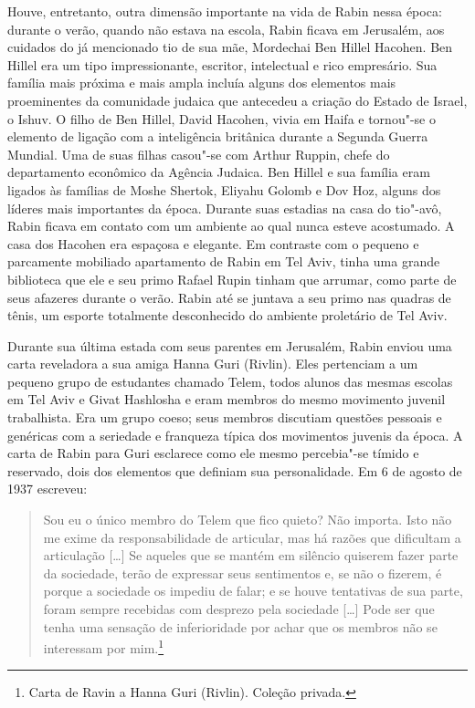 Houve, entretanto, outra dimensão importante na vida de Rabin nessa
época: durante o verão, quando não estava na escola, Rabin ficava em
Jerusalém, aos cuidados do já mencionado tio de sua mãe, Mordechai Ben Hillel Hacohen.
Ben Hillel era um tipo impressionante, escritor, intelectual e rico
empresário. Sua família mais próxima e mais ampla incluía alguns dos
elementos mais proeminentes da comunidade judaica que antecedeu a
criação do Estado de Israel, o Ishuv. O filho de Ben Hillel, David
Hacohen, vivia em Haifa e tornou"-se o elemento de ligação com a
inteligência britânica durante a Segunda Guerra Mundial. Uma de suas
filhas casou"-se com Arthur Ruppin, chefe do departamento econômico da
Agência Judaica. Ben Hillel e sua família eram ligados às famílias de
Moshe Shertok, Eliyahu Golomb e Dov Hoz, alguns dos líderes mais
importantes da época. Durante suas estadias na casa do tio"-avô, Rabin ficava
em contato com um ambiente ao qual nunca esteve acostumado. A casa dos
Hacohen era espaçosa e elegante. Em contraste com o pequeno e parcamente
mobiliado apartamento de Rabin em Tel Aviv, tinha uma grande biblioteca
que ele e seu primo Rafael Rupin tinham que arrumar, como parte de
seus afazeres durante o verão. Rabin até se juntava a seu primo nas
quadras de tênis, um esporte totalmente desconhecido do ambiente
proletário de Tel Aviv.

Durante sua última estada com seus parentes em Jerusalém, Rabin enviou
uma carta reveladora a sua amiga Hanna Guri (Rivlin). Eles pertenciam a
um pequeno grupo de estudantes chamado Telem, todos alunos das mesmas
escolas em Tel Aviv e Givat Hashlosha e eram membros do mesmo movimento
juvenil trabalhista. Era um grupo coeso; seus membros discutiam questões
pessoais e genéricas com a seriedade e franqueza típica dos movimentos
juvenis da época. A carta de Rabin para Guri esclarece como ele mesmo
percebia"-se tímido e reservado, dois dos elementos que definiam sua
personalidade. Em 6 de agosto de 1937 escreveu: 

\begin{quote}
Sou eu o único membro
do Telem que fico quieto? Não importa. Isto não me exime da
responsabilidade de articular, mas há razões que dificultam a
articulação {[}\ldots{}{]} Se aqueles que se mantém em silêncio quiserem fazer parte
da sociedade, terão de expressar seus sentimentos e, se não o fizerem,
é porque a sociedade os impediu de falar; e se houve tentativas de sua
parte, foram sempre recebidas com desprezo pela sociedade {[}\ldots{}{]} Pode ser
que tenha uma sensação de inferioridade por achar que os membros não se
interessam por mim.\footnote{Carta de Ravin a Hanna Guri (Rivlin). Coleção privada.}
\end{quote}

